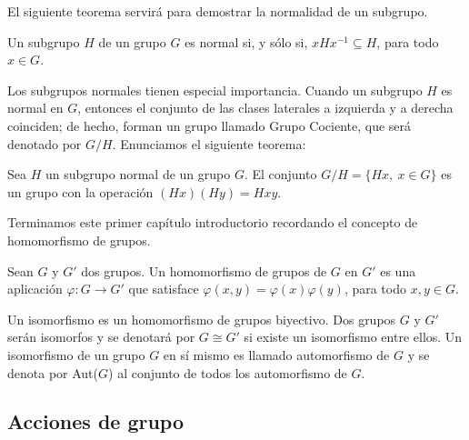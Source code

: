 El siguiente teorema servirá para demostrar la normalidad de un subgrupo.
\begin{theorem}
Un subgrupo $H$ de un grupo $G$ es normal si, y sólo si, $xHx^{-1} \subseteq H$, para todo $x \in G$.
\end{theorem}


Los subgrupos normales tienen especial importancia. Cuando un subgrupo $H$ es normal en $G$, entonces el conjunto de las clases laterales a izquierda y a derecha coinciden; de hecho, forman un grupo llamado Grupo Cociente, que será denotado por $G/H$. Enunciamos el siguiente teorema:

\begin{theorem}
Sea $H$ un subgrupo normal de un grupo $G$. El conjunto $G/H = \{ Hx, \: x \in G\}$ es un grupo con la operación $(Hx)(Hy)=Hxy$.
\end{theorem}





Terminamos este primer capítulo introductorio recordando el concepto de homomorfismo de grupos.

\begin{definition}
Sean $G$ y $G'$ dos grupos. Un homomorfismo de grupos de $G$ en $G'$ es una aplicación $\varphi \colon G \to G'$ que satisface $\varphi(x,y)=\varphi(x)\varphi(y)$, para todo $x, y \in G$.



\end{definition}

\begin{definition}
    Un isomorfismo es un homomorfismo de grupos biyectivo. Dos grupos $G$ y $G'$ serán isomorfos y se denotará por $G \cong G'$ si existe un isomorfismo entre ellos.
    Un isomorfismo de un grupo $G$ en sí mismo es llamado automorfismo de $G$ y se denota por Aut($G$) al conjunto de todos los automorfismo de $G$.
\end{definition}



\newpage
\subsection{Acciones de grupo} \label{acciones}

